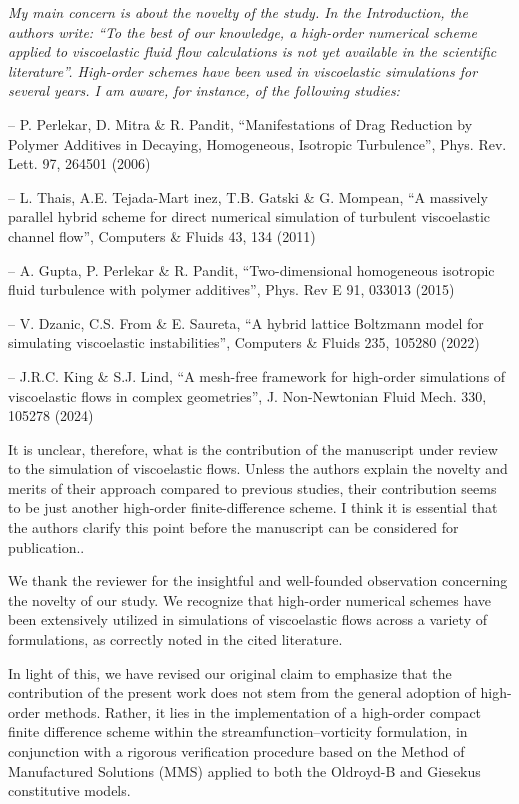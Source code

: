\documentclass[12pt]{article}
\begin{document}
{\it My main concern is about the novelty of the study. In the Introduction, the authors write: “To the best of our knowledge, a high-order numerical scheme applied to viscoelastic fluid flow calculations is not yet
available in the scientific literature”. High-order schemes have been used in viscoelastic simulations for several years. I am aware, for instance, of the following studies:

– P. Perlekar, D. Mitra \& R. Pandit, “Manifestations of Drag Reduction by Polymer Additives in Decaying, Homogeneous, Isotropic Turbulence”, Phys. Rev. Lett. 97, 264501 (2006)

– L. Thais, A.E. Tejada-Mart inez, T.B. Gatski \& G. Mompean, “A massively parallel hybrid scheme for direct numerical simulation of turbulent viscoelastic channel flow”, Computers \& Fluids 43, 134 (2011)

– A. Gupta, P. Perlekar \& R. Pandit, “Two-dimensional homogeneous isotropic fluid turbulence with polymer additives”, Phys. Rev E 91, 033013 (2015)

– V. Dzanic, C.S. From \& E. Saureta, “A hybrid lattice Boltzmann model for simulating viscoelastic instabilities”, Computers \& Fluids 235, 105280 (2022)

– J.R.C. King \& S.J. Lind, “A mesh-free framework for high-order simulations of viscoelastic flows in complex geometries”, J. Non-Newtonian Fluid Mech. 330, 105278 (2024) 

It is unclear, therefore, what is the contribution of the manuscript under review to the simulation of viscoelastic flows. Unless the authors explain the novelty and merits of their approach compared to previous studies, their
contribution seems to be just another high-order finite-difference scheme. I think it is essential that the authors clarify this point before the manuscript can be considered for publication..}

\vspace{3mm}
We thank the reviewer for the insightful and well-founded observation concerning the novelty of our study. We recognize that high-order numerical schemes have been extensively utilized in simulations of viscoelastic flows across a variety of formulations, as correctly noted in the cited literature.

In light of this, we have revised our original claim to emphasize that the contribution of the present work does not stem from the general adoption of high-order methods. Rather, it lies in the implementation of a high-order compact finite difference scheme within the streamfunction–vorticity formulation, in conjunction with a rigorous verification procedure based on the Method of Manufactured Solutions (MMS) applied to both the Oldroyd-B and Giesekus constitutive models.
\end{document}
